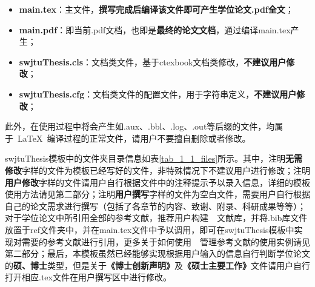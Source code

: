\par
\begin{itemize}
  \item \textbf{main.tex}：主文件，\textbf{撰写完成后编译该文件即可产生学位论文.pdf全文}；
  \item \textbf{main.pdf}：即当前.pdf文档，也即是\textbf{最终的论文文档}，通过编译main.tex产生；
  \item \textbf{swjtuThesis.cls}：文档类文件，基于ctexbook文档类修改，\textbf{不建议用户修改}；
  \item \textbf{swjtuThesis.cfg}：文档类文件的配置文件，用于字符串定义，\textbf{不建议用户修改}；
\end{itemize}

\par
此外，在使用过程中将会产生如.aux、.bbl、.log、.out等后缀的文件，均属于~\LaTeX{}~编译过程的正常文件，请用户不要擅自删除或者修改。

\par
swjtuThesis模板中的文件夹目录信息如表\ref{tab_1_1_files}所示。其中，注明\textbf{无需修改}字样的文件为模板已经写好的文件，非特殊情况下不建议用户进行修改；注明\textbf{用户修改}字样的文件请用户自行根据文件中的注释提示予以录入信息，详细的模板使用方法请见第二部分；注明\textbf{用户撰写}字样的文件为空白文件，需要用户自行根据自己的论文需求进行撰写（包括了各章节的内容、致谢、附录、科研成果等等）；对于学位论文中所引用全部的参考文献，推荐用户构建~\BibTeX~文献库，并将.bib库文件放置于ref文件夹中，并在main.tex文件中予以调用，即可在swjtuThesis模板中实现对需要的参考文献进行引用，更多关于如何使用~\BibTeX~管理参考文献的使用实例请见第二部分；最后，本模板虽然已经能够实现根据用户输入的信息自行判断学位论文的\textbf{硕、博士}类型，但是关于\textbf{《博士创新声明》}及\textbf{《硕士主要工作》}文件请用户自行打开相应.tex文件在用户撰写区中进行修改。

